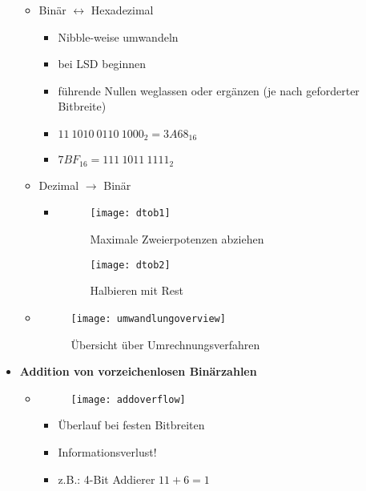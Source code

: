 \begin{itemize}
\begin{itemize}
	\item Binär $\leftrightarrow$ Hexadezimal
		\begin{itemize}
		\item Nibble-weise umwandeln
		\item bei LSD beginnen 
		\item führende Nullen weglassen oder ergänzen (je nach geforderter Bitbreite)
		\item $11~1010~0110~1000_2 = 3A68_{16}$
		\item $7BF_{16} = 111~1011~1111_2$
		\end{itemize}
		
	\item Dezimal $\rightarrow$ Binär
		\begin{itemize}
		
		\item[]
			\begin{minipage}{0.3\textwidth}
				\begin{figure}[H]
				\texttt{[image: dtob1]}
				\caption{Maximale Zweierpotenzen abziehen}
				\end{figure}
			\end{minipage}
			\begin{minipage}[t]{0.35\textwidth}
				\begin{figure}[H]
				\vspace{-3cm}
				\texttt{[image: dtob2]}
				\caption{Halbieren mit Rest}
				\end{figure}
			\end{minipage}
		
		\end{itemize}
	
	\item[] 
		\begin{figure}[H]
		\begin{center}
			\texttt{[image: umwandlungoverview]}
			\caption{Übersicht über Umrechnungsverfahren}
			\end{center}
		\end{figure}
	\end{itemize}

\item \textbf{Addition von vorzeichenlosen Binärzahlen}
	\begin{itemize}
	\item 
		\begin{minipage}{0.4\textwidth}
			\begin{figure}[H]
			\texttt{[image: addoverflow]}
			\end{figure}
		\end{minipage}
		\begin{minipage}[t]{0.4\textwidth}
			\vspace{-1.5cm}
			\begin{itemize}
				\item Überlauf bei festen Bitbreiten
				\item Informationsverlust!
				\item z.B.: 4-Bit Addierer $11+6=1$
			\end{itemize}
		\end{minipage}
	

\end{itemize}
\end{itemize}
